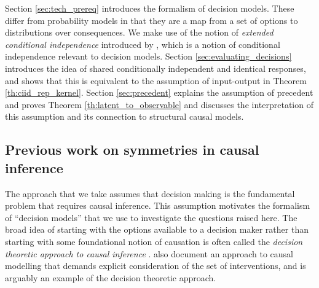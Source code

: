 \documentclass[USenglish,onecolumn]{article}
\begin{document}
Section \ref{sec:tech_prereq} introduces the formalism of decision models. These differ from probability models in that they are a map from a set of options to distributions over consequences. We make use of the notion of \emph{extended conditional independence} introduced by \citet{constantinou_extended_2017}, which is a notion of conditional independence relevant to decision models. Section \ref{sec:evaluating_decisions} introduces the idea of shared conditionally independent and identical responses, and shows that this is equivalent to the assumption of input-output in Theorem \ref{th:ciid_rep_kernel}. Section \ref{sec:precedent} explains the assumption of precedent and proves Theorem \ref{th:latent_to_observable} and discusses the interpretation of this assumption and its connection to structural causal models.

\subsection{Previous work on symmetries in causal inference}\label{sec:prev_work}

The approach that we take assumes that decision making is the fundamental problem that requires causal inference. This assumption motivates the formalism of ``decision models'' that we use to investigate the questions raised here. The broad idea of starting with the options available to a decision maker rather than starting with some foundational notion of causation is often called the \emph{decision theoretic approach to causal inference} \citep{heckerman_decision-theoretic_1995,dawid_decision-theoretic_2012,dawid_decision-theoretic_2020}. \citet{lattimore_causal_2019,lattimore_replacing_2019} also document an approach to causal modelling that demands explicit consideration of the set of interventions, and is arguably an example of the decision theoretic approach.
\end{document}
